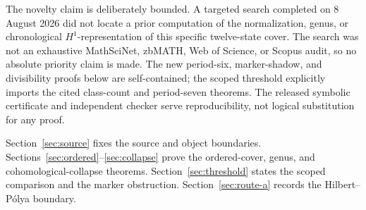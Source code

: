 The novelty claim is deliberately bounded.  A targeted search completed on
8 August 2026 did not locate a prior computation of the normalization,
genus, or chronological $H^1$-representation of this specific twelve-state
cover.  The search was not an exhaustive MathSciNet, zbMATH, Web of Science,
or Scopus audit, so no absolute priority claim is made.  The new period-six,
marker-shadow, and divisibility proofs below are self-contained; the scoped
threshold explicitly imports the cited class-count and period-seven
theorems.  The released symbolic certificate and independent checker serve
reproducibility, not logical substitution for any proof.

Section~\ref{sec:source} fixes the source and object boundaries.
Sections~\ref{sec:ordered}--\ref{sec:collapse} prove the ordered-cover,
genus, and cohomological-collapse theorems.  Section~\ref{sec:threshold}
states the scoped comparison and the marker obstruction.
Section~\ref{sec:route-a} records the Hilbert--P\'olya boundary.
